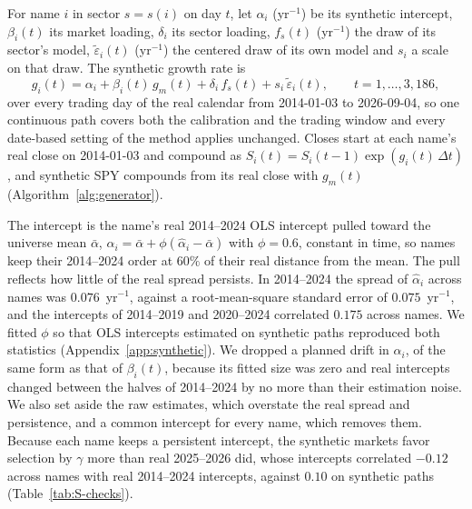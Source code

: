 For name $i$ in sector $s = s(i)$ on day $t$, let $\alpha_i$ (yr$^{-1}$) be its synthetic intercept, $\beta_i(t)$ its
market loading, $\delta_i$ its sector loading, $f_s(t)$ (yr$^{-1}$) the draw of its sector's model,
$\tilde\varepsilon_i(t)$ (yr$^{-1}$) the centered draw of its own model and $s_i$ a scale on that draw. The synthetic
growth rate is
\begin{equation}
  g_i(t) = \alpha_i + \beta_i(t)\, g_m(t) + \delta_i\, f_s(t) + s_i\, \tilde\varepsilon_i(t),
  \qquad t = 1, \dots, 3{,}186,
  \label{eq:compose}
\end{equation}
over every trading day of the real calendar from 2014-01-03 to 2026-09-04, so one continuous path covers both the
calibration and the trading window and every date-based setting of the method applies unchanged. Closes start at each
name's real close on 2014-01-03 and compound as $S_i(t) = S_i(t-1)\exp(g_i(t)\,\Delta t)$, and synthetic SPY
compounds from its real close with $g_m(t)$ (Algorithm~\ref{alg:generator}).

The intercept is the name's real 2014--2024 OLS intercept pulled toward the universe mean $\bar\alpha$,
$\alpha_i = \bar\alpha + \phi(\hat\alpha_i - \bar\alpha)$ with $\phi = 0.6$, constant in time, so names keep their
2014--2024 order at $60\%$ of their real distance from the mean. The pull reflects how little of the real spread
persists. In 2014--2024 the spread of $\hat\alpha_i$ across names was $0.076$~yr$^{-1}$, against a root-mean-square
standard error of $0.075$~yr$^{-1}$, and the intercepts of 2014--2019 and 2020--2024 correlated $0.175$ across names.
We fitted $\phi$ so that OLS intercepts estimated on synthetic paths reproduced both statistics
(Appendix~\ref{app:synthetic}). We dropped a planned drift in $\alpha_i$, of the same form as that of $\beta_i(t)$,
because its fitted size was zero and real intercepts changed between the halves of 2014--2024 by no more than their
estimation noise. We also set aside the raw estimates, which overstate the real spread and persistence, and a common
intercept for every name, which removes them. Because each name keeps a persistent intercept, the synthetic markets
favor selection by $\gamma$ more than real 2025--2026 did, whose intercepts correlated $-0.12$ across names with
real 2014--2024 intercepts, against $0.10$ on synthetic paths (Table~\ref{tab:S-checks}).

